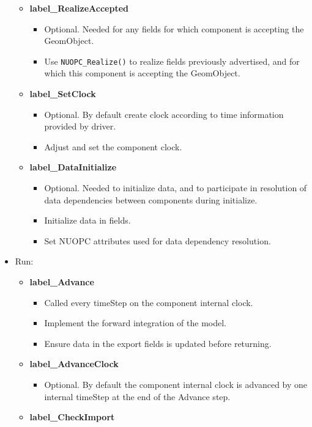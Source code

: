 \begin{itemize}
\begin{itemize}
\begin{itemize}
    \end{itemize}
    \item {\bf label\_RealizeAccepted}
    \begin{itemize}
      \item Optional. Needed for any fields for which component is accepting the GeomObject.
      \item Use {\tt NUOPC\_Realize()} to realize fields previously advertised, and for which this component is accepting the GeomObject.
    \end{itemize}
    \item {\bf label\_SetClock}
    \begin{itemize}
      \item Optional. By default create clock according to time information provided by driver.
      \item Adjust and set the component clock.
    \end{itemize}
    \item {\bf label\_DataInitialize}
    \begin{itemize}
      \item Optional. Needed to initialize data, and to participate in resolution of data dependencies between components during initialize.
      \item Initialize data in fields.
      \item Set NUOPC attributes used for data dependency resolution.
    \end{itemize}
  \end{itemize}
  \item Run:
  \begin{itemize}
    \item {\bf label\_Advance}
    \begin{itemize}
      \item Called every timeStep on the component internal clock.
      \item Implement the forward integration of the model.
      \item Ensure data in the export fields is updated before returning.
    \end{itemize}
    \item {\bf label\_AdvanceClock}
    \begin{itemize}
      \item Optional. By default the component internal clock is advanced by one internal timeStep at the end of the Advance step.
    \end{itemize}
    \item {\bf label\_CheckImport}

\end{itemize}
\end{itemize}
